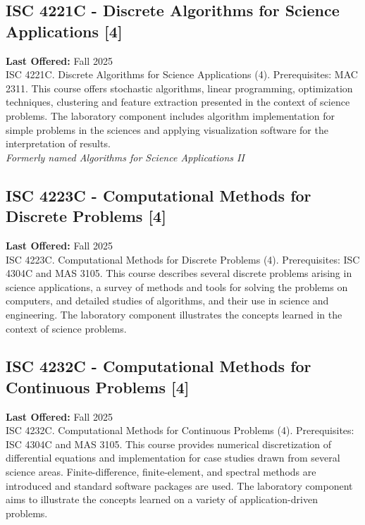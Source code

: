 \documentclass[12pt,a4paper]{article}
\begin{document}
\subsection{ISC 4221C - Discrete Algorithms for Science Applications [4]}
\textbf{Last Offered:} Fall 2025 \\
ISC 4221C. Discrete Algorithms for Science Applications (4). Prerequisites: MAC 2311. This course offers stochastic algorithms, linear programming, optimization techniques, clustering and feature extraction presented in the context of science problems. The laboratory component includes algorithm implementation for simple problems in the sciences and applying visualization software for the interpretation of results. \\
\textit{Formerly named Algorithms for Science Applications II}

\subsection{ISC 4223C - Computational Methods for Discrete Problems [4]}
\textbf{Last Offered:} Fall 2025 \\
ISC 4223C. Computational Methods for Discrete Problems (4). Prerequisites: ISC 4304C and MAS 3105. This course describes several discrete problems arising in science applications, a survey of methods and tools for solving the problems on computers, and detailed studies of algorithms, and their use in science and engineering. The laboratory component illustrates the concepts learned in the context of science problems.

\subsection{ISC 4232C - Computational Methods for Continuous Problems [4]}
\textbf{Last Offered:} Fall 2025 \\
ISC 4232C. Computational Methods for Continuous Problems (4). Prerequisites: ISC 4304C and MAS 3105. This course provides numerical discretization of differential equations and implementation for case studies drawn from several science areas. Finite-difference, finite-element, and spectral methods are introduced and standard software packages are used. The laboratory component aims to illustrate the concepts learned on a variety of application-driven problems.
\end{document}
